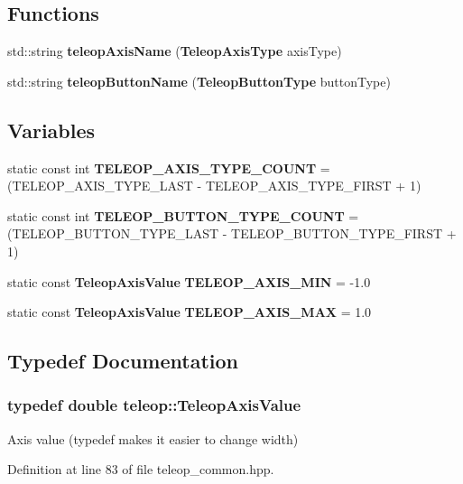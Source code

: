 \subsection*{Functions}
\begin{DoxyCompactItemize}
\item 
std::string {\bf teleopAxisName} ({\bf TeleopAxisType} axisType)
\item 
std::string {\bf teleopButtonName} ({\bf TeleopButtonType} buttonType)
\end{DoxyCompactItemize}
\subsection*{Variables}
\begin{DoxyCompactItemize}
\item 
static const int {\bf TELEOP\_\-AXIS\_\-TYPE\_\-COUNT} = (TELEOP\_\-AXIS\_\-TYPE\_\-LAST -\/ TELEOP\_\-AXIS\_\-TYPE\_\-FIRST + 1)
\item 
static const int {\bf TELEOP\_\-BUTTON\_\-TYPE\_\-COUNT} = (TELEOP\_\-BUTTON\_\-TYPE\_\-LAST -\/ TELEOP\_\-BUTTON\_\-TYPE\_\-FIRST + 1)
\end{DoxyCompactItemize}
{\bf }\par
\begin{DoxyCompactItemize}
\item 
static const {\bf TeleopAxisValue} {\bf TELEOP\_\-AXIS\_\-MIN} = -\/1.0
\item 
static const {\bf TeleopAxisValue} {\bf TELEOP\_\-AXIS\_\-MAX} = 1.0
\end{DoxyCompactItemize}



\subsection{Typedef Documentation}
\subsubsection[{TeleopAxisValue}]{\setlength{\rightskip}{0pt plus 5cm}typedef double {\bf teleop::TeleopAxisValue}}\label{namespaceteleop_a76a980352ec9e25c22a88993b56e7085}
Axis value (typedef makes it easier to change width) 

Definition at line 83 of file teleop\_\-common.hpp.

